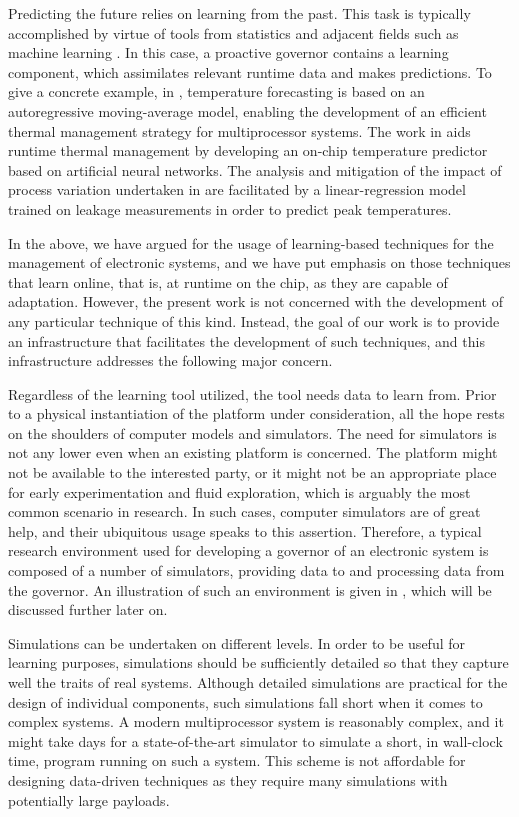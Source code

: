 Predicting the future relies on learning from the past. This task is typically
accomplished by virtue of tools from statistics and adjacent fields such as
machine learning \cite{bishop2006}. In this case, a proactive governor contains
a learning component, which assimilates relevant runtime data and makes
predictions. To give a concrete example, in \cite{coskun2008}, temperature
forecasting is based on an autoregressive moving-average model, enabling the
development of an efficient thermal management strategy for multiprocessor
systems. The work in \cite{kumar2010} aids runtime thermal management by
developing an on-chip temperature predictor based on artificial neural networks.
The analysis and mitigation of the impact of process variation undertaken in
\cite{juan2014} are facilitated by a linear-regression model trained on leakage
measurements in order to predict peak temperatures.

In the above, we have argued for the usage of learning-based techniques for the
management of electronic systems, and we have put emphasis on those techniques
that learn online, that is, at runtime on the chip, as they are capable of
adaptation. However, the present work is not concerned with the development of
any particular technique of this kind. Instead, the goal of our work is to
provide an infrastructure that facilitates the development of such techniques,
and this infrastructure addresses the following major concern.


Regardless of the learning tool utilized, the tool needs data to learn from.
Prior to a physical instantiation of the platform under consideration, all the
hope rests on the shoulders of computer models and simulators. The need for
simulators is not any lower even when an existing platform is concerned. The
platform might not be available to the interested party, or it might not be an
appropriate place for early experimentation and fluid exploration, which is
arguably the most common scenario in research. In such cases, computer
simulators are of great help, and their ubiquitous usage speaks to this
assertion. Therefore, a typical research environment used for developing a
governor of an electronic system is composed of a number of simulators,
providing data to and processing data from the governor. An illustration of such
an environment is given in , which will be discussed further
later on.

Simulations can be undertaken on different levels. In order to be useful for
learning purposes, simulations should be sufficiently detailed so that they
capture well the traits of real systems. Although detailed simulations are
practical for the design of individual components, such simulations fall short
when it comes to complex systems. A modern multiprocessor system is reasonably
complex, and it might take days for a state-of-the-art simulator to simulate a
short, in wall-clock time, program running on such a system. This scheme is not
affordable for designing data-driven techniques as they require many simulations
with potentially large payloads.

